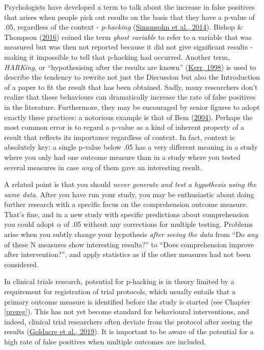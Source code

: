 \documentclass{krantz}
\begin{document}
Psychologists have developed a term to talk about the increase in false positives that arises when people pick out results on the basis that they have a p-value of .05, regardless of the context - \emph{p-hacking} (\protect\hyperlink{ref-simonsohn2014a}{Simonsohn et al., 2014}). Bishop \& Thompson (\protect\hyperlink{ref-bishop2016}{2016}) coined the term \emph{ghost variable} to refer to a variable that was measured but was then not reported because it did not give significant results - making it impossible to tell that p-hacking had occurred. Another term, \emph{HARKing}, or ``hypothesising after the results are known'' (\protect\hyperlink{ref-kerr1998}{Kerr, 1998}) is used to describe the tendency to rewrite not just the Discussion but also the Introduction of a paper to fit the result that has been obtained. Sadly, many researchers don't realize that these behaviours can dramatically increase the rate of false positives in the literature. Furthermore, they may be encouraged by senior figures to adopt exactly these practices: a notorious example is that of Bem (\protect\hyperlink{ref-bem2004}{2004}). Perhaps the most common error is to regard a p-value as a kind of inherent property of a result that reflects its importance regardless of context. In fact, context is absolutely key: a single p-value below .05 has a very different meaning in a study where you only had one outcome measure than in a study where you tested several measures in case \emph{any} of them gave an interesting result.

A related point is that you should \emph{never generate and test a hypothesis using the same data}. After you have run your study, you may be enthusiastic about doing further research with a specific focus on the comprehension outcome measure. That's fine, and in a new study with specific predictions about comprehension you could adopt \(\alpha\) of .05 without any corrections for multiple testing. Problems arise when you subtly change your hypothesis \emph{after seeing the data} from ``Do \emph{any} of these N measures show interesting results?'' to ``Does comprehension improve after intervention?'', and apply statistics as if the other measures had not been considered.

In clinical trials research, potential for p-hacking is in theory limited by a requirement for registration of trial protocols, which usually entails that a primary outcome measure is identified before the study is started (see Chapter \ref{prereg}). This has not yet become standard for behavioural interventions, and indeed, clinical trial researchers often deviate from the protocol after seeing the results (\protect\hyperlink{ref-goldacre2019}{Goldacre et al., 2019}). It is important to be aware of the potential for a high rate of false positives when multiple outcomes are included.
\end{document}
